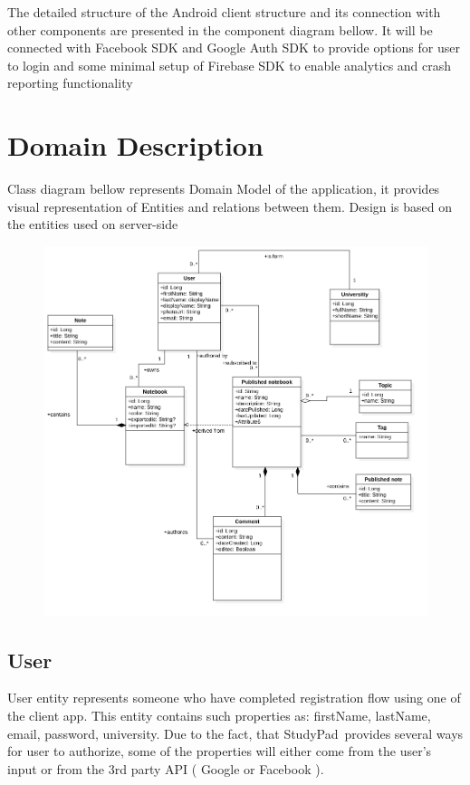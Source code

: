 \documentclass[thesis=B,english]{FITthesis}[2012/10/20]
\newcommand{\appname}{StudyPad}
\begin{document}
 
 
 The detailed structure of the Android client structure and its connection with other components are presented in the component diagram bellow. It will be connected with Facebook SDK and Google Auth SDK to provide options for user to login and some minimal setup of Firebase SDK to enable analytics and crash reporting functionality 


\section{Domain Description}
Class diagram bellow represents Domain Model of the application, it provides visual representation of Entities and relations between them. Design is based on the entities used on server-side

\begin{figure}[t]
	\includegraphics[scale=0.4]{Domain}
\end{figure}

\subsection{User}
	User entity represents someone who have completed registration flow using one of the client app. This entity contains such properties as: firstName, lastName, email, password, university. Due to the fact, that \appname\ provides several ways for user to authorize, some of the properties will either come from the user's input or from the 3rd party API ( Google or Facebook ).
\end{document}
